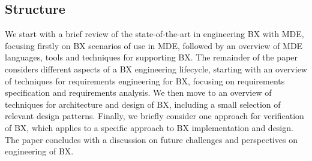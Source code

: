 \subsection{Structure}
We start with a brief review of the state-of-the-art in engineering BX with MDE, focusing firstly on BX scenarios of use in MDE, followed by an overview of MDE languages, tools and techniques for supporting BX. The remainder of the paper considers different aspects of a BX engineering lifecycle, starting with an overview of techniques for requirements engineering for BX, focusing on requirements specification and requirements analysis. We then move to an overview of techniques for architecture and design of BX, including a small selection of relevant design patterns. Finally, we briefly consider one approach for verification of BX, which applies to a specific approach to BX implementation and design. The paper concludes with a discussion on future challenges and perspectives on engineering of BX.

